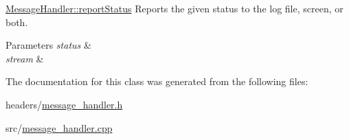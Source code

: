 \hyperlink{classMessageHandler_a3c896ccad36637cb0423a5e11ccfe6a5}{Message\+Handler\+::report\+Status} Reports the given status to the log file, screen, or both. 


\begin{DoxyParams}{Parameters}
{\em status} & \\
\hline
{\em stream} & \\
\hline
\end{DoxyParams}


The documentation for this class was generated from the following files\+:\begin{DoxyCompactItemize}
\item 
headers/\hyperlink{message__handler_8h}{message\+\_\+handler.\+h}\item 
src/\hyperlink{message__handler_8cpp}{message\+\_\+handler.\+cpp}\end{DoxyCompactItemize}
